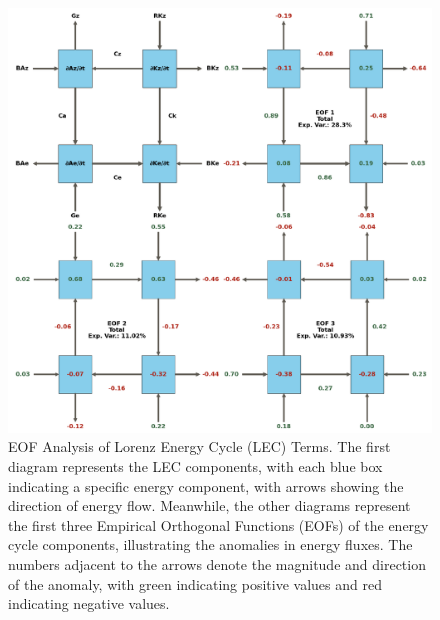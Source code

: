 \begin{figure}[!htbp]
\centering
\includegraphics[width=32pc]{figs_5/eofs_total.pdf}
\caption[EOF Analysis - Total Lifecycle]{EOF Analysis of Lorenz Energy Cycle (LEC) Terms. The first diagram represents the LEC components, with each blue box indicating a specific energy component, with arrows showing the direction of energy flow. Meanwhile, the other diagrams represent the first three Empirical Orthogonal Functions (EOFs) of the energy cycle components, illustrating the anomalies in energy fluxes. 
The numbers adjacent to the arrows denote the magnitude and direction of the anomaly, with green indicating positive values and red indicating negative values.}
\label{fig:eofs_total}
\end{figure}



